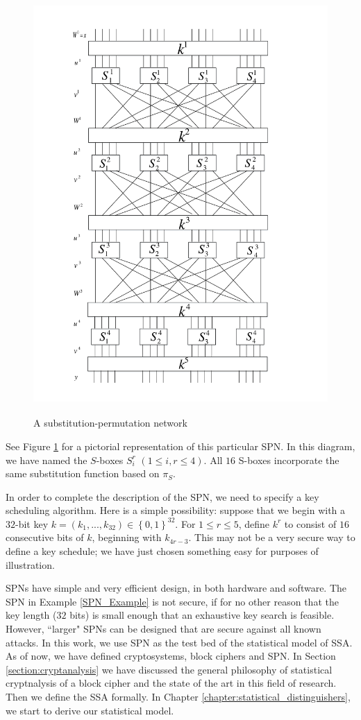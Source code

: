 \begin{figure}[h!]
    \centering
    \includegraphics[width=.9\textwidth, height=16cm]{images/SPNDiagram}
    \caption{A substitution-permutation network}
    \label{fig:SPN}
\end{figure}See Figure \ref{fig:SPN} for a pictorial representation of this particular SPN. In this diagram, we have named the $S$-boxes $S_{i}^r$ $(1 \leq i,r \leq 4)$. All $16$ S-boxes incorporate the same substitution function based on $\pi_S$.\par \noindent
In order to complete the description of the SPN, we need to specify a key scheduling algorithm. Here is a simple possibility: suppose that we begin with a $32$-bit key $k = (k_1,...,k_{32}) \in \left\lbrace 0,1 \right\rbrace^{32}$. For $1 \leq r \leq 5$, define $k^r$ to consist of $16$ consecutive bits of $k$, beginning with $k_{4r-3}$. This may not be a very secure way to define a key schedule; we have just chosen something easy for purposes of illustration.\par \noindent SPNs have simple and very efficient design, in both hardware and software. The SPN in Example \ref{SPN_Example} is not secure, if for no other reason that the key length ($32$ bits) is small enough that an exhaustive key search is feasible. However, ``larger" SPNs can be designed that are secure against all known attacks. In this work, we use SPN as the test bed of the statistical model of SSA. As of now, we have defined cryptosystems, block ciphers and SPN. In Section \ref{section:cryptanalysis} we have discussed the general philosophy of statistical cryptnalysis of a block cipher and the state of the art in this field of research. Then we define the SSA formally. In Chapter \ref{chapter:statistical_distinguishers}, we start to derive our statistical model.
